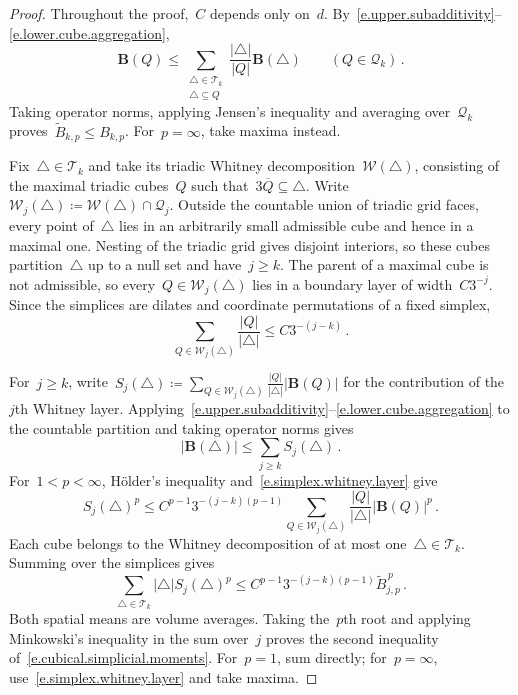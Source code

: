 \documentclass[11pt,letterpaper]{article}
\numberwithin{equation}{section}
\theoremstyle{definition}
\begin{document}
\begin{proof}
Throughout the proof,~$C$ depends only on~$d$. By~\eqref{e.upper.subadditivity}--\eqref{e.lower.cube.aggregation},
\begin{equation*}
	\mathbf B(Q)\leq \sum_{\substack{\triangle\in\mathscr T_k\\\triangle\subseteq Q}} \frac{|\triangle|}{|Q|}\mathbf B(\triangle) \qquad(Q\in\mathscr Q_k)\,.
\end{equation*}
Taking operator norms, applying Jensen's inequality and averaging over~$\mathscr Q_k$ proves~$\widetilde B_{k,p}\leq B_{k,p}$. For~$p=\infty$, take maxima instead.

\smallskip

Fix~$\triangle\in\mathscr T_k$ and take its triadic Whitney decomposition~$\mathscr W(\triangle)$, consisting of the maximal triadic cubes~$Q$ such that~$3\overline Q\subseteq\triangle$. Write~$\mathscr W_j(\triangle)\coloneqq\mathscr W(\triangle)\cap\mathscr Q_j$. Outside the countable union of triadic grid faces, every point of~$\triangle$ lies in an arbitrarily small admissible cube and hence in a maximal one. Nesting of the triadic grid gives disjoint interiors, so these cubes partition~$\triangle$ up to a null set and have~$j\geq k$. The parent of a maximal cube is not admissible, so every~$Q\in\mathscr W_j(\triangle)$ lies in a boundary layer of width~$C3^{-j}$. Since the simplices are dilates and coordinate permutations of a fixed simplex,
\begin{equation}
	\sum_{Q\in\mathscr W_j(\triangle)}\frac{|Q|}{|\triangle|} \leq C3^{-(j-k)}\,.
	\label{e.simplex.whitney.layer}
\end{equation}

For~$j\geq k$, write~$S_j(\triangle)\coloneqq\sum_{Q\in\mathscr W_j(\triangle)}\frac{|Q|}{|\triangle|}|\mathbf B(Q)|$ for the contribution of the~$j$th Whitney layer. Applying~\eqref{e.upper.subadditivity}--\eqref{e.lower.cube.aggregation} to the countable partition and taking operator norms gives
\begin{equation*}
	|\mathbf B(\triangle)|\leq\sum_{j\geq k}S_j(\triangle)\,.
\end{equation*}
For~$1<p<\infty$, H\"older's inequality and~\eqref{e.simplex.whitney.layer} give
\begin{equation*}
	S_j(\triangle)^p\leq C^{p-1}3^{-(j-k)(p-1)}\sum_{Q\in\mathscr W_j(\triangle)}\frac{|Q|}{|\triangle|}|\mathbf B(Q)|^p\,.
\end{equation*}
Each cube belongs to the Whitney decomposition of at most one~$\triangle\in\mathscr T_k$. Summing over the simplices gives
\begin{equation*}
	\sum_{\triangle\in\mathscr T_k}|\triangle|S_j(\triangle)^p\leq C^{p-1}3^{-(j-k)(p-1)}\widetilde B_{j,p}^{\,p}\,.
\end{equation*}
Both spatial means are volume averages. Taking the~$p$th root and applying Minkowski's inequality in the sum over~$j$ proves the second inequality of~\eqref{e.cubical.simplicial.moments}. For~$p=1$, sum directly; for~$p=\infty$, use~\eqref{e.simplex.whitney.layer} and take maxima.
\end{proof}
\end{document}

